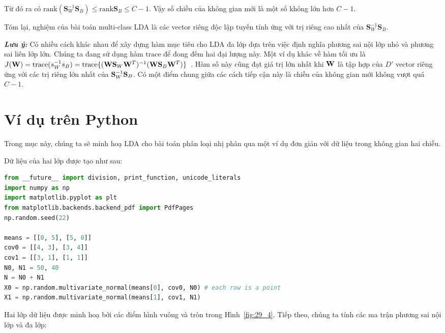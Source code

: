 
Từ đó ra có $\text{rank}\left(\mathbf{S}_W^{-1} \mathbf{S}_B\right) \leq
\text{rank}\mathbf{S}_B \leq C - 1$. Vậy số chiều của không gian mới là một số
không lớn hơn $C-1$.

Tóm lại, nghiệm của bài toán multi-class LDA là các vector riêng độc lập tuyến tính ứng với trị riêng cao nhất của $\mathbf{S}_W^{-1} \mathbf{S}_B$.

\textit{\textbf{Lưu ý:}} Có nhiều cách khác nhau để xây dựng hàm mục tiêu cho LDA đa lớp dựa trên việc định nghĩa phương sai nội lớp nhỏ và phương sai liên lớp lớn. Chúng ta đang sử dụng hàm $\text{trace}$ để đong đếm hai đại lượng này.
Một ví dụ khác về hàm tối ưu là $J(\mathbf{W}) = \text{trace}(s_W^{-1}s_B) =
\text{trace}\{(\mathbf{W}\mathbf{S}_W\mathbf{W}^T)^{-1}(\mathbf{W}\mathbf{S}_B\mathbf{W}^T)\}$~\cite{fukunaga2013introduction}.
Hàm số này cũng đạt giá trị lớn nhất khi $\mathbf{W}$ là tập hợp của $D'$ vector riêng
ứng với các trị riêng lớn nhất của $\mathbf{S}_W^{-1}\mathbf{S}_B$. Có một điểm chung giữa các
cách tiếp cận này là chiều của không gian mới không vượt quá $C-1$.


\section{Ví dụ trên Python}
\label{sec:29_4}
Trong mục này, chúng ta sẽ minh hoạ LDA cho bài toán phân loại nhị phân qua một
ví dụ đơn giản với dữ liệu trong không gian hai chiều.

Dữ liệu của hai lớp được tạo như sau:
\begin{lstlisting}[language=Python]
from __future__ import division, print_function, unicode_literals
import numpy as np
import matplotlib.pyplot as plt
from matplotlib.backends.backend_pdf import PdfPages
np.random.seed(22)

means = [[0, 5], [5, 0]]
cov0 = [[4, 3], [3, 4]]
cov1 = [[3, 1], [1, 1]]
N0, N1 = 50, 40
N = N0 + N1
X0 = np.random.multivariate_normal(means[0], cov0, N0) # each row is a point
X1 = np.random.multivariate_normal(means[1], cov1, N1)
\end{lstlisting}

Hai lớp dữ liệu được minh hoạ bởi các điểm hình vuông và tròn trong Hình~\ref{fig:29_4}.
Tiếp theo, chúng ta tính các ma trận phương sai nội lớp và đa lớp:

